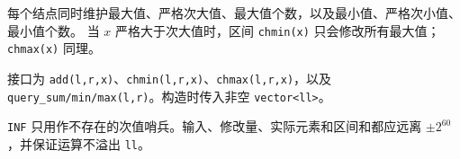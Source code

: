 每个结点同时维护最大值、严格次大值、最大值个数，以及最小值、严格次小值、最小值个数。
当 $x$ 严格大于次大值时，区间 \texttt{chmin(x)} 只会修改所有最大值；\texttt{chmax(x)} 同理。

接口为 \texttt{add(l,r,x)}、\texttt{chmin(l,r,x)}、\texttt{chmax(l,r,x)}，以及
\texttt{query\_sum/min/max(l,r)}。构造时传入非空 \texttt{vector<ll>}。

\begin{icpcwarning}[数值范围]
  \texttt{INF} 只用作不存在的次值哨兵。输入、修改量、实际元素和区间和都应远离
  $\pm2^{60}$，并保证运算不溢出 \texttt{ll}。
\end{icpcwarning}
